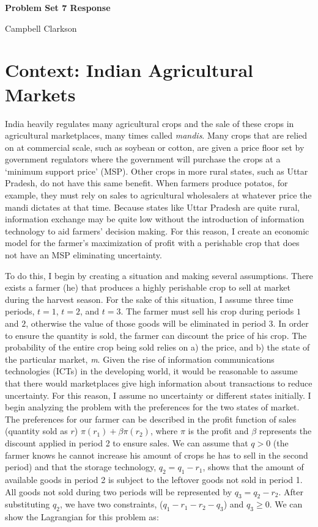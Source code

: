 \documentclass[11pt]{article}
\begin{document}
\newpage
\begin{center}
	\textbf{Problem Set 7 Response} 
	
	Campbell Clarkson
\end{center}

\section{Context: Indian Agricultural Markets}\label{section1}

\noindent India heavily regulates many agricultural crops and the sale of these crops in agricultural marketplaces, many times called \textit{mandis}. Many crops that are relied on at commercial scale, such as soybean or cotton, are given a price floor set by government regulators where the government will purchase the crops at a `minimum support price' (MSP). Other crops in more rural states, such as Uttar Pradesh, do not have this same benefit. When farmers produce potatos, for example, they must rely on sales to agricultural wholesalers at whatever price the mandi dictates at that time. Because states like Uttar Pradesh are quite rural, information exchange may be quite low without the introduction of information technology to aid farmers' decision making. For this reason, I create an economic model for the farmer's maximization of profit with a perishable crop that does not have an MSP eliminating uncertainty.

To do this, I begin by creating a situation and making several assumptions. There exists a farmer (he) that produces a highly perishable crop to sell at market during the harvest season. For the sake of this situation, I assume three time periods, $t = 1$, $t = 2$, and $t = 3$. The farmer must sell his crop during periods $1$ and $2$, otherwise the value of those goods will be eliminated in period $3$. In order to ensure the quantity is sold, the farmer can discount the price of his crop. The probability of the entire crop being sold relies on a) the price, and b) the state of the particular market, \textit{m}. Given the rise of information communications technologies (ICTs) in the developing world, it would be reasonable to assume that there would marketplaces give high information about transactions to reduce uncertainty. For this reason, I assume no uncertainty or different states initially. I begin analyzing the problem with the preferences for the two states of market. The preferences for our farmer can be described in the profit function of sales (quantity sold as $r$) $\pi(r_1) + \beta\pi(r_2)$, where $\pi$ is the profit and $\beta$ represents the discount applied in period 2 to ensure sales. We can assume that $q > 0$ (the farmer knows he cannot increase his amount of crops he has to sell in the second period) and that the storage technology, $q_2 = q_1 - r_1$, shows that the amount of available goods in period 2 is subject to the leftover goods not sold in period 1. All goods not sold during two periods will be represented by $q_3 = q_2 - r_2$. After substituting $q_2$, we have two constraints, ($q_1 - r_1 - r_2 - q_3$) and $q_3\geq0$. We can show the Lagrangian for this problem as:
\end{document}

